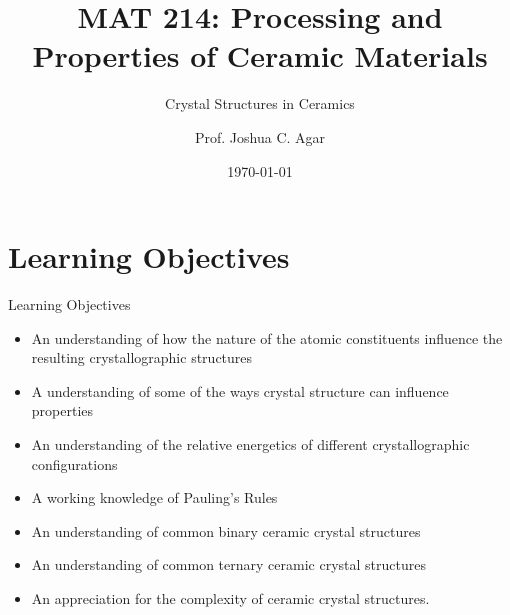 \documentclass{libs/XJTLU_format}
\title[MAT 214 Spring 2022]{\textbf{MAT 214:  Processing and Properties of Ceramic Materials}}
\subtitle{Crystal Structures in Ceramics}
\author{Prof. Joshua C. Agar}
\institute[Lehigh University]{
    \normalsize{\email{jca318@lehigh.edu}}
    \newline
    \department{Materials Science and Engineering}
    \newline
    \university{Lehigh Univeristy}
}
\date{\today}
\begin{document}


\begin{frame}{}
    \maketitle
\end{frame}

\section{Learning Objectives}
\begin{frame}{Learning Objectives}
\begin{itemize}
    \item An understanding of how the nature of the atomic constituents influence the resulting crystallographic structures
    \pause
    \item A understanding of some of the ways crystal structure can influence properties
    \pause
    \item An understanding of the relative energetics of different crystallographic configurations
    \pause
    \item A working knowledge of Pauling's Rules
    \pause
    \item An understanding of common binary ceramic crystal structures
    \pause
    \item An understanding of common ternary ceramic crystal structures
    \pause
    \item An appreciation for the complexity of ceramic crystal structures.
\end{itemize}
    
\end{frame}
\end{document}
